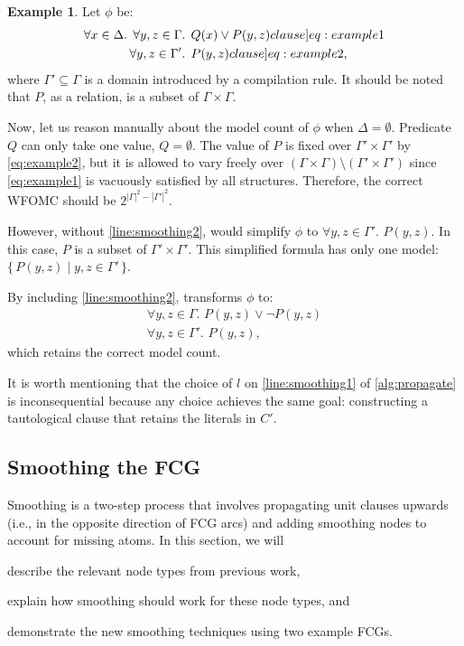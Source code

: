\documentclass[letterpaper]{article} %
\theoremstyle{remark}
\theoremstyle{definition}
\newtheorem{example}{Example}
\begin{document}
\begin{example}\label{example:basecasesmoothing}
  Let $\phi$ be:
  \begin{align}
    \forall x \in \Delta\text{. }\forall y, z \in \Gamma&\text{. }Q(x) \lor P(y, z)\label[clause]{eq:example1}\\
    \forall y, z \in \Gamma'&\text{. }P(y, z)\label[clause]{eq:example2},
  \end{align}
  where $\Gamma' \subseteq \Gamma$ is a domain introduced by a compilation rule.
  It should be noted that $P$, as a relation, is a subset of
  $\Gamma \times \Gamma$.

  Now, let us reason manually about the model count of $\phi$ when
  $\Delta = \emptyset$. Predicate $Q$ can only take one value, $Q = \emptyset$.
  The value of $P$ is fixed over $\Gamma' \times \Gamma'$ by \cref{eq:example2},
  but it is allowed to vary freely over
  $(\Gamma \times \Gamma) \setminus (\Gamma' \times \Gamma')$ since
  \cref{eq:example1} is vacuously satisfied by all structures. Therefore, the
  correct WFOMC should be $2^{|\Gamma|^2 - |\Gamma'|^2}$.

  However, without \cref{line:smoothing2}, \Propagate would simplify $\phi$ to
  $\forall y, z \in \Gamma'\text{. }P(y, z)$. In this case, $P$ is a subset of
  $\Gamma' \times \Gamma'$. This simplified formula has only one model:
  $\{\, P(y, z) \mid y, z \in \Gamma' \,\}$.

  By including \cref{line:smoothing2}, \Propagate transforms $\phi$ to:
  \begin{gather*}
    \forall y, z \in \Gamma\text{. }P(y, z) \lor \neg P(y, z)\\
    \forall y, z \in \Gamma'\text{. }P(y, z),
  \end{gather*}
  which retains the correct model count.
\end{example}

It is worth mentioning that the choice of $l$ on \cref{line:smoothing1} of
\cref{alg:propagate} is inconsequential because any choice achieves the same
goal: constructing a tautological clause that retains the literals in $C'$.

\subsection{Smoothing the FCG}\label{sec:smoothingfcg1}

Smoothing is a two-step process that involves propagating unit clauses upwards
(i.e., in the opposite direction of FCG arcs) and adding smoothing nodes to
account for missing atoms. In this section, we will
\begin{enumerate*}[label=(\roman*)]
  \item describe the relevant node types from previous work,
  \item explain how smoothing should work for these node types, and
  \item demonstrate the new smoothing techniques using two example FCGs.
\end{enumerate*}
\end{document}
